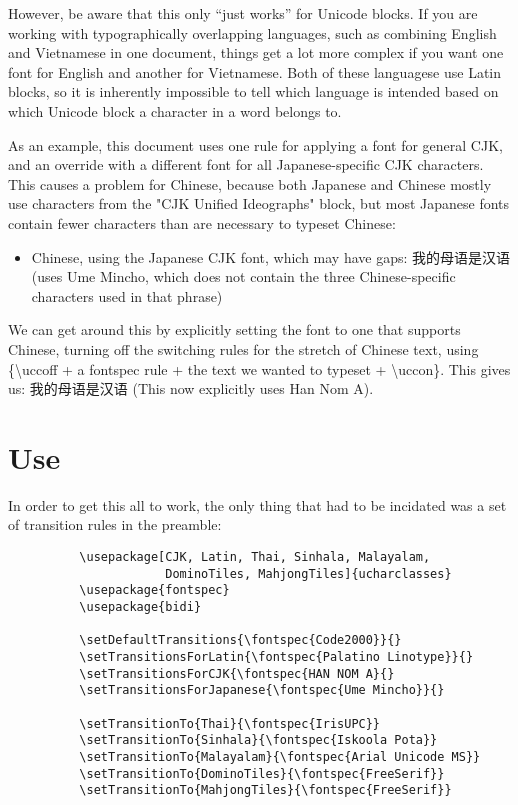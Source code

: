 ﻿\documentclass{article}
\newenvironment{itemlist}{%
  \begin{itemize}
	\setlength{\itemsep}{0pt}
	\setlength{\parsep}{0pt}
	\setlength{\topsep}{0pt}
	\setlength{\partopsep}{0pt}
	\setlength{\parskip}{0pt}
	\setlength{\labelsep}{5pt}}%
{
  \end{itemize}}
\begin{document}
		However, be aware that this only “just works” for Unicode blocks. If you are working with typographically overlapping languages, such as combining English and Vietnamese in one document, things get a lot more complex if you want one font for English and another for Vietnamese. Both of these languagese use Latin blocks, so it is inherently impossible to tell which language is intended based on which Unicode block a character in a word belongs to.
		
		As an example, this document uses one rule for applying a font for general CJK, and an override with a different font for all Japanese-specific CJK characters. This causes a problem for Chinese, because both Japanese and Chinese mostly use characters from the "CJK Unified Ideographs" block, but most Japanese fonts contain fewer characters than are necessary to typeset Chinese:

    \begin{itemlist}
			\item Chinese, using the Japanese CJK font, which may have gaps: 我的母语是汉语 (uses Ume Mincho, which does not contain the three Chinese-specific characters used in that phrase)
    \end{itemlist}

  We can get around this by explicitly setting the font to one that supports Chinese, turning off the switching rules for the stretch of Chinese text, using \{\textbackslash uccoff + a fontspec rule + the text we wanted to typeset + \textbackslash uccon\}. This gives us: {\uccoff {} 我的母语是汉语 \uccon} (This now explicitly uses Han Nom A).

	\section{Use}

		In order to get this all to work, the only thing that had to be incidated was a set of transition rules in the preamble:
		
		\disableTransitionRules
		\begin{verbatim}
　　　　　　\usepackage[CJK, Latin, Thai, Sinhala, Malayalam,
　　　　　　            DominoTiles, MahjongTiles]{ucharclasses}
　　　　　　\usepackage{fontspec}
　　　　　　\usepackage{bidi}

　　　　　　\setDefaultTransitions{\fontspec{Code2000}}{}
　　　　　　\setTransitionsForLatin{\fontspec{Palatino Linotype}}{}
　　　　　　\setTransitionsForCJK{\fontspec{HAN NOM A}{}
　　　　　　\setTransitionsForJapanese{\fontspec{Ume Mincho}}{}

　　　　　　\setTransitionTo{Thai}{\fontspec{IrisUPC}}
　　　　　　\setTransitionTo{Sinhala}{\fontspec{Iskoola Pota}}
　　　　　　\setTransitionTo{Malayalam}{\fontspec{Arial Unicode MS}}
　　　　　　\setTransitionTo{DominoTiles}{\fontspec{FreeSerif}}
　　　　　　\setTransitionTo{MahjongTiles}{\fontspec{FreeSerif}}
		\end{verbatim}
		\enableTransitionRules
\end{document}

